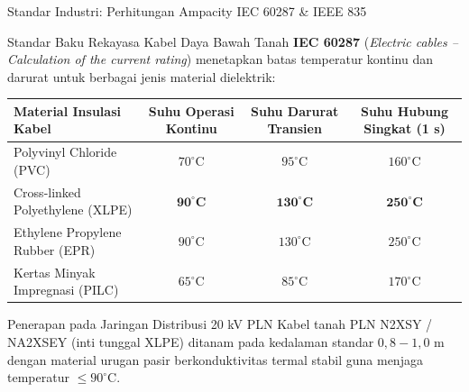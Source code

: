 \documentclass[aspectratio=169,10pt]{beamer}
\begin{document}
\begin{frame}{Standar Industri: Perhitungan Ampacity IEC 60287 \& IEEE 835}
  \begin{block}{Standar Baku Rekayasa Kabel Daya Bawah Tanah}
    \textbf{IEC 60287} (\textit{Electric cables -- Calculation of the current rating}) menetapkan batas temperatur kontinu dan darurat untuk berbagai jenis material dielektrik:
  \end{block}
  \vspace{0.1cm}
  \begin{table}[h]
    \centering
    \scriptsize
    \begin{tabular}{lccc}
      \toprule
      \textbf{Material Insulasi Kabel} & \textbf{Suhu Operasi Kontinu} & \textbf{Suhu Darurat Transien} & \textbf{Suhu Hubung Singkat (1 s)} \\
      \midrule
      Polyvinyl Chloride (PVC) & $70^\circ\text{C}$ & $95^\circ\text{C}$ & $160^\circ\text{C}$ \\
      Cross-linked Polyethylene (XLPE) & $\mathbf{90^\circ\text{C}}$ & $\mathbf{130^\circ\text{C}}$ & $\mathbf{250^\circ\text{C}}$ \\
      Ethylene Propylene Rubber (EPR) & $90^\circ\text{C}$ & $130^\circ\text{C}$ & $250^\circ\text{C}$ \\
      Kertas Minyak Impregnasi (PILC) & $65^\circ\text{C}$ & $85^\circ\text{C}$ & $170^\circ\text{C}$ \\
      \bottomrule
    \end{tabular}
  \end{table}
  \begin{alertblock}{Penerapan pada Jaringan Distribusi 20 kV PLN}
    Kabel tanah PLN N2XSY / NA2XSEY (inti tunggal XLPE) ditanam pada kedalaman standar $0{,}8 - 1{,}0\text{ m}$ dengan material urugan pasir berkonduktivitas termal stabil guna menjaga temperatur $\le 90^\circ\text{C}$.
  \end{alertblock}
\end{frame}
\end{document}
